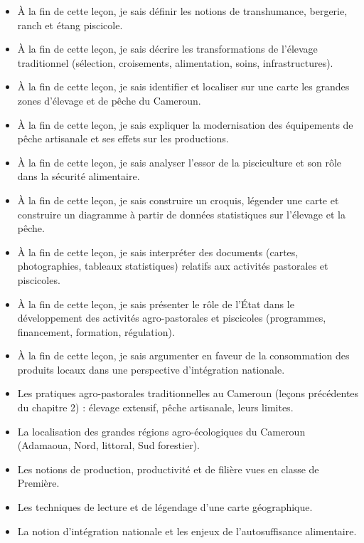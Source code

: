 \documentclass[11pt]{article}
\begin{document}
\begin{objectifs}
\begin{itemize}
\item À la fin de cette leçon, je sais définir les notions de transhumance, bergerie, ranch et étang piscicole.
\item À la fin de cette leçon, je sais décrire les transformations de l'élevage traditionnel (sélection, croisements, alimentation, soins, infrastructures).
\item À la fin de cette leçon, je sais identifier et localiser sur une carte les grandes zones d'élevage et de pêche du Cameroun.
\item À la fin de cette leçon, je sais expliquer la modernisation des équipements de pêche artisanale et ses effets sur les productions.
\item À la fin de cette leçon, je sais analyser l'essor de la pisciculture et son rôle dans la sécurité alimentaire.
\item À la fin de cette leçon, je sais construire un croquis, légender une carte et construire un diagramme à partir de données statistiques sur l'élevage et la pêche.
\item À la fin de cette leçon, je sais interpréter des documents (cartes, photographies, tableaux statistiques) relatifs aux activités pastorales et piscicoles.
\item À la fin de cette leçon, je sais présenter le rôle de l'État dans le développement des activités agro-pastorales et piscicoles (programmes, financement, formation, régulation).
\item À la fin de cette leçon, je sais argumenter en faveur de la consommation des produits locaux dans une perspective d'intégration nationale.
\end{itemize}
\end{objectifs}

\begin{prerequis}
\begin{itemize}
\item Les pratiques agro-pastorales traditionnelles au Cameroun (leçons précédentes du chapitre 2) : élevage extensif, pêche artisanale, leurs limites.
\item La localisation des grandes régions agro-écologiques du Cameroun (Adamaoua, Nord, littoral, Sud forestier).
\item Les notions de production, productivité et de filière vues en classe de Première.
\item Les techniques de lecture et de légendage d'une carte géographique.
\item La notion d'intégration nationale et les enjeux de l'autosuffisance alimentaire.
\end{itemize}
\end{prerequis}
\end{document}
